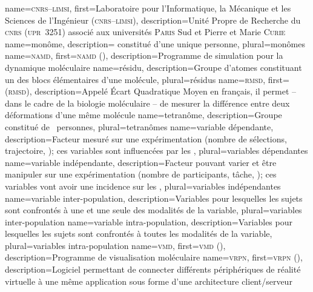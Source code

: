 %
{%
	name={\textsc{cnrs--limsi}},%
	first={Laboratoire pour l'Informatique, la Mécanique et les Sciences de l'Ingénieur (\textsc{cnrs--limsi})},%
	description={Unité Propre de Recherche du \textsc{cnrs} (\textsc{upr}~3251) associé aux universités \textsc{Paris} Sud et Pierre et Marie \textsc{Curie}}%
}
%
{%
	name={monôme},%
	description={ constitué d'une unique personne},%
	plural={monômes}%
}
%
{%
	name={\textsc{namd}},%
	first={\textsc{namd} ()},%
	description={Programme de simulation pour la dynamique moléculaire }%
}
%
{%
	name={résidu},%
	description={Groupe d'atomes constituant un des blocs élémentaires d'une molécule},%
	plural={résidus}%
}
%
{%
	name={\textsc{rmsd}},%
	first={ (\textsc{rmsd})},%
	description={Appelé Écart Quadratique Moyen en français, il permet -- dans le cadre de la biologie moléculaire -- de mesurer la différence entre deux déformations d'une même molécule}%
}
%
{%
	name={tetranôme},%
	description={Groupe constitué de ~personnes},%
	plural={tetranômes}%
}
%
{%
	name={variable dépendante},%
	description={Facteur mesuré sur une expérimentation (nombre de sélections, trajectoire, \myetc); ces variables sont influencées par les },%
	plural={variables dépendantes}%
}
%
{%
	name={variable indépendante},%
	description={Facteur pouvant varier et être manipuler sur une expérimentation (nombre de participants, tâche, \myetc); ces variables vont avoir une incidence sur les },%
	plural={variables indépendantes}%
}
%
{%
	name={variable inter-population},%
	description={Variables pour lesquelles les sujets sont confrontés à une et une seule des modalités de la variable},%
	plural={variables inter-population}%
}
%
{%
	name={variable intra-population},%
	description={Variables pour lesquelles les sujets sont confrontés à toutes les modalités de la variable},%
	plural={variables intra-population}%
}
%
{%
	name={\textsc{vmd}},%
	first={\textsc{vmd} ()},%
	description={Programme de visualisation moléculaire }%
}
%
{%
	name={\textsc{vrpn}},%
	first={\textsc{vrpn} ()},%
	description={Logiciel permettant de connecter différents périphériques de réalité virtuelle à une même application sous forme d'une architecture client/serveur }%
}
